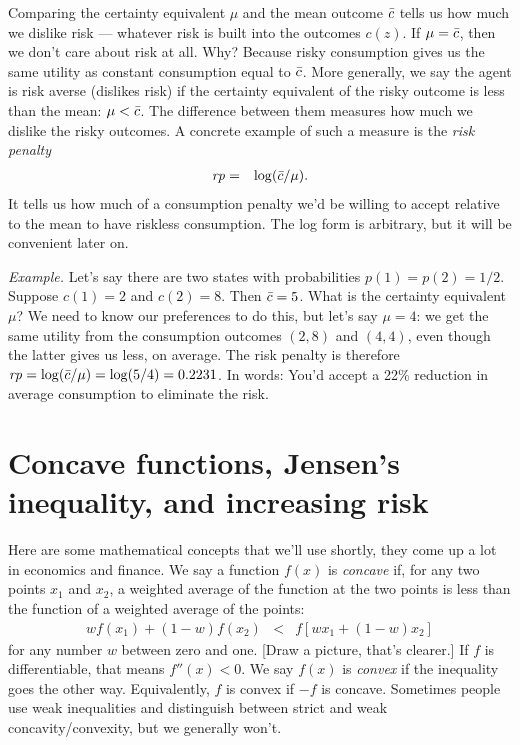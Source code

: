 \documentclass[11pt]{article}
\begin{document}
Comparing the certainty equivalent $\mu$ and the mean outcome $\bar{c}$
tells us how much we dislike risk --- whatever risk is built into the outcomes $c(z)$.
If $\mu = \bar{c}$,
then we don't care about risk at all.
Why?
Because risky consumption gives us the same
utility as constant consumption equal to $\bar{c}$.
More generally, we say the agent is risk averse (dislikes risk)
if the certainty equivalent of the risky outcome
is less than the mean:   $\mu < \bar{c}$.
The difference between them measures how much we dislike the risky outcomes.
A concrete example of such a measure is the {\it risk penalty\/}
\begin{eqnarray}
    \mbox{\em rp\/} &=& \log (\bar{c}/\mu)  .
    \label{eq:rp-def}
\end{eqnarray}
It tells us how much of a consumption penalty we'd be willing to accept
relative to the mean to have riskless consumption.
The log form is arbitrary, but it will be convenient later on.

{\it Example.\/}
Let's say there are two states with probabilities
$p(1) = p(2) = 1/2$.
Suppose $c(1) = 2$ and $c(2) = 8$.
Then $\bar{c} = 5$.
What is the certainty equivalent $\mu$?
We need to know our preferences to do this,
but let's say $\mu = 4$:  we get the same utility
from the consumption outcomes $(2,8)$ and $(4,4)$,
even though the latter gives us less, on average.
The risk penalty is therefore
$ \mbox{\em rp\/} = \log (\bar{c}/\mu) = \log(5/4) = 0.2231$.
In words: You'd accept a 22\% reduction in average consumption to eliminate the risk.


\section{Concave functions, Jensen's inequality, and increasing risk}

Here are some mathematical concepts that we'll use shortly,
they come up a lot in economics and finance.
We say a function $f(x)$ is {\it concave\/}
if, for any two points $x_1$ and $x_2$,
a weighted average of the function at the two points
is less than the function of a weighted average of the points:
\begin{eqnarray}
    w f(x_1) + (1-w) f(x_2) &<& f[ w x_1 + (1-w) x_2]
    \label{eq:concave-def}
\end{eqnarray}
for any number $w$ between zero and one.
[Draw a picture, that's clearer.]
If $f$ is differentiable, that means $f''(x) < 0$.
We say $f(x)$ is  {\it convex\/}
if the inequality goes the other way.
Equivalently, $f$ is convex if $-f$ is concave.
Sometimes people use weak inequalities and distinguish
between strict and weak concavity/convexity, but we generally won't.
\end{document}

